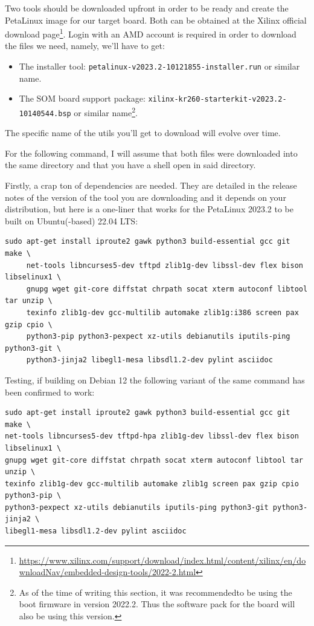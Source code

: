 \documentclass[10pt]{article}
\begin{document}
Two tools should be downloaded upfront in order to be ready and create the
PetaLinux image for our target board. Both can be obtained at the Xilinx
official download page\footnote{\url{https://www.xilinx.com/support/download/index.html/content/xilinx/en/downloadNav/embedded-design-tools/2022-2.html}}. Login with an AMD account is required in order to
download the files we need, namely, we'll have to get:
\begin{itemize}
\item The installer tool: \texttt{petalinux-v2023.2-10121855-installer.run} or similar name.
\item The SOM board support package: \texttt{xilinx-kr260-starterkit-v2023.2-10140544.bsp} or similar name\footnote{As of the time of writing this section, it was recommended\footnotemark to be
using the boot firmware in version 2022.2. Thus the software pack for the board
will also be using this version.}.
\end{itemize}
The specific name of the utils you'll get to download will evolve over time.

For the following command, I will assume that both files were downloaded into
the same directory and that you have a shell open in said directory.

Firstly, a crap ton of dependencies are needed. They are detailed in the
release notes of the version of the tool you are downloading and it depends on
your distribution, but here is a one-liner that works for the PetaLinux 2023.2
to be built on Ubuntu(-based) 22.04 LTS:
\begin{verbatim}
sudo apt-get install iproute2 gawk python3 build-essential gcc git make \
     net-tools libncurses5-dev tftpd zlib1g-dev libssl-dev flex bison libselinux1 \
     gnupg wget git-core diffstat chrpath socat xterm autoconf libtool tar unzip \
     texinfo zlib1g-dev gcc-multilib automake zlib1g:i386 screen pax gzip cpio \
     python3-pip python3-pexpect xz-utils debianutils iputils-ping python3-git \
     python3-jinja2 libegl1-mesa libsdl1.2-dev pylint asciidoc
\end{verbatim}

Testing, if building on Debian 12 the following variant of the same command has been confirmed to work:
\begin{verbatim}
sudo apt-get install iproute2 gawk python3 build-essential gcc git make \
net-tools libncurses5-dev tftpd-hpa zlib1g-dev libssl-dev flex bison libselinux1 \
gnupg wget git-core diffstat chrpath socat xterm autoconf libtool tar unzip \
texinfo zlib1g-dev gcc-multilib automake zlib1g screen pax gzip cpio python3-pip \
python3-pexpect xz-utils debianutils iputils-ping python3-git python3-jinja2 \
libegl1-mesa libsdl1.2-dev pylint asciidoc
\end{verbatim}
\end{document}
